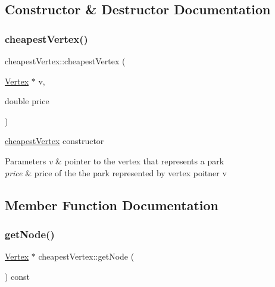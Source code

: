 \subsection{Constructor \& Destructor Documentation}
\hypertarget{classcheapest_vertex_aeeb883f2da756be42b775dd19c2afbbb}{}\label{classcheapest_vertex_aeeb883f2da756be42b775dd19c2afbbb} 
\subsubsection{\texorpdfstring{cheapest\+Vertex()}{cheapestVertex()}}
{\footnotesize\ttfamily cheapest\+Vertex\+::cheapest\+Vertex (\begin{DoxyParamCaption}\item[{\hyperlink{class_vertex}{Vertex} $\ast$}]{v,  }\item[{double}]{price }\end{DoxyParamCaption})}



\hyperlink{classcheapest_vertex}{cheapest\+Vertex} constructor 


\begin{DoxyParams}{Parameters}
{\em v} & pointer to the vertex that represents a park\\
\hline
{\em price} & price of the the park represented by vertex poitner v \\
\hline
\end{DoxyParams}


\subsection{Member Function Documentation}
\hypertarget{classcheapest_vertex_a65a0aef884d80b9d11bd8ce90a337e2b}{}\label{classcheapest_vertex_a65a0aef884d80b9d11bd8ce90a337e2b} 
\subsubsection{\texorpdfstring{get\+Node()}{getNode()}}
{\footnotesize\ttfamily \hyperlink{class_vertex}{Vertex} $\ast$ cheapest\+Vertex\+::get\+Node (\begin{DoxyParamCaption}{ }\end{DoxyParamCaption}) const}



